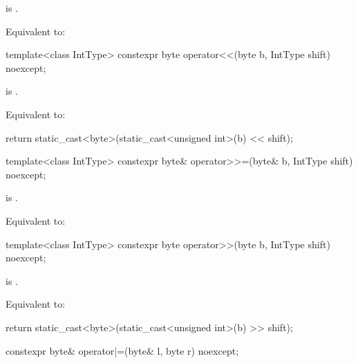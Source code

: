 \begin{itemdescr}
\pnum
\constraints
{} is .

\pnum
\effects
Equivalent to:
\end{itemdescr}

%
\begin{itemdecl}
template<class IntType>
  constexpr byte operator<<(byte b, IntType shift) noexcept;
\end{itemdecl}

\begin{itemdescr}
\pnum
\constraints
{} is .

\pnum
\effects
Equivalent to:
\begin{codeblock}
return static_cast<byte>(static_cast<unsigned int>(b) << shift);
\end{codeblock}
\end{itemdescr}

%
\begin{itemdecl}
template<class IntType>
  constexpr byte& operator>>=(byte& b, IntType shift) noexcept;
\end{itemdecl}

\begin{itemdescr}
\pnum
\constraints
{} is .

\pnum
\effects
Equivalent to:
\end{itemdescr}

%
\begin{itemdecl}
template<class IntType>
  constexpr byte operator>>(byte b, IntType shift) noexcept;
\end{itemdecl}

\begin{itemdescr}
\pnum
\constraints
{} is .

\pnum
\effects
Equivalent to:
\begin{codeblock}
return static_cast<byte>(static_cast<unsigned int>(b) >> shift);
\end{codeblock}
\end{itemdescr}

%
\begin{itemdecl}
constexpr byte& operator|=(byte& l, byte r) noexcept;
\end{itemdecl}

